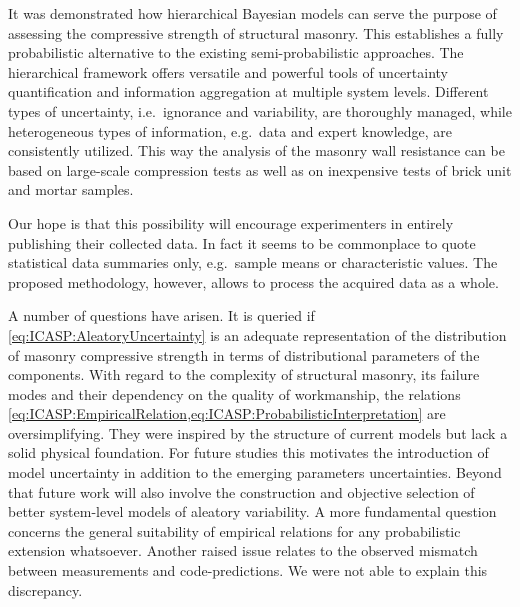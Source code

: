 It was demonstrated how hierarchical Bayesian models can serve the purpose of assessing the compressive strength of structural masonry.
This establishes a fully probabilistic alternative to the existing semi-probabilistic approaches.
The hierarchical framework offers versatile and powerful tools of uncertainty quantification and information aggregation at multiple system levels.
Different types of uncertainty, i.e.\ ignorance and variability, are thoroughly managed, while heterogeneous types of information, e.g.\ data and expert knowledge, are consistently utilized.
This way the analysis of the masonry wall resistance can be based on large-scale compression tests as well as on inexpensive tests of brick unit and mortar samples.
\par %
Our hope is that this possibility will encourage experimenters in entirely publishing their collected data.
In fact it seems to be commonplace to quote statistical data summaries only, e.g.\ sample means or characteristic values.
The proposed methodology, however, allows to process the acquired data as a whole.
\par %
A number of questions have arisen.
It is queried if \cref{eq:ICASP:AleatoryUncertainty} is an adequate representation of the distribution of masonry compressive strength in terms of distributional parameters of the components.
With regard to the complexity of structural masonry, its failure modes and their dependency on the quality of workmanship,
the relations \cref{eq:ICASP:EmpiricalRelation,eq:ICASP:ProbabilisticInterpretation} are oversimplifying.
They were inspired by the structure of current models but lack a solid physical foundation.
For future studies this motivates the introduction of model uncertainty in addition to the emerging parameters uncertainties.
Beyond that future work will also involve the construction and objective selection of better system-level models of aleatory variability.
A more fundamental question concerns the general suitability of empirical relations for any probabilistic extension whatsoever.
Another raised issue relates to the observed mismatch between measurements and code-predictions.
We were not able to explain this discrepancy.